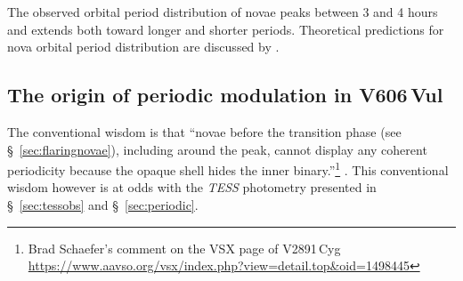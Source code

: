 \documentclass[twocolumn]{aastex631}
\newcommand{\nova}{V606\,Vul}
\begin{document}
The observed orbital period distribution of novae peaks between 3 and 4
hours \citep{2013MNRAS.436.2412T,2021MNRAS.501.6083F,2022MNRAS.517.3640S} and extends both toward longer and shorter periods. 
Theoretical predictions for nova orbital period distribution are discussed by
\cite{2004ApJ...602..938N,2005ApJ...628..395T,2016MNRAS.458.2916C,2020NatAs...4..886H}.


\subsection{The origin of periodic modulation in \nova{}}
\label{sec:periodicorigin}

The conventional wisdom is that 
``novae before the transition phase (see \S~\ref{sec:flaringnovae}), including around the peak, 
cannot display any coherent periodicity because the opaque shell hides the inner
binary.''\footnote{Brad Schaefer's comment on the VSX page of V2891\,Cyg 
\url{https://www.aavso.org/vsx/index.php?view=detail.top&oid=1498445}}
\citep{1980MNRAS.191..933M,1990LNP...369..342L}. This conventional wisdom
however is at odds with the {\em TESS} photometry presented in
\S~\ref{sec:tessobs} and \S~\ref{sec:periodic}.
\end{document}
